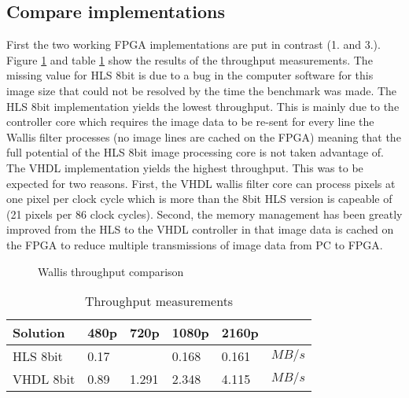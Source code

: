 \subsection{Compare implementations}
First the two working FPGA implementations are put in contrast (1. and 3.).
Figure \ref{fig:benchmarkcompare} and table \ref{tab:throughputmeasuremetns}
show the results of the throughput measurements. The missing value for HLS 8bit
is due to a bug in the computer software for this image size that could not be
resolved by the time the benchmark was made. The HLS 8bit implementation yields
the lowest throughput. This is mainly due to the controller core which requires
the image data to be re-sent for every line the Wallis filter processes 
(no
image lines are cached on the FPGA) meaning
that the full potential of the HLS 8bit image processing core is not taken
advantage of. The VHDL implementation yields the
highest
throughput. This was to be expected for two
reasons. First, the VHDL wallis filter core can process pixels at one pixel per
clock cycle which is more than the 8bit HLS version is capeable of (21 pixels
per 86 clock cycles).
Second, the memory management has been greatly improved from the HLS to the VHDL
controller in that image data is cached on the FPGA to reduce multiple
transmissions of image data from PC to FPGA. 

\begin{figure}[tb!]
    \centering
    \begin{adjustbox}{max width=\linewidth}
        
    \end{adjustbox}
    \caption{Wallis throughput comparison}
    \label{fig:benchmarkcompare}
\end{figure}

\begin{table}[tb!]
    \centering
    \begin{tabular}{l l l l l l}
        \toprule
        Solution & 480p & 720p & 1080p & 2160p & \\
        \midrule
        HLS 8bit   & 0.17  &       & 0.168 & 0.161 & $MB/s$ \\
        VHDL 8bit      & 0.89  & 1.291 & 2.348 & 4.115 & $MB/s$\\
        \bottomrule
    \end{tabular}
    \caption{Throughput measurements}
    \label{tab:throughputmeasuremetns}
\end{table}

